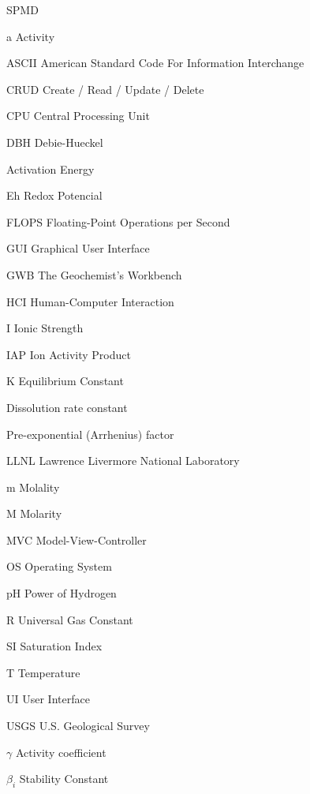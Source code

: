 \documentclass[ppgc,mestrado,English]{iiufrgs}
\begin{document}
\begin{listofabbrv}{SPMD}
\item[a] Activity
\item[ASCII] American Standard Code For Information Interchange
\item[CRUD] Create / Read / Update / Delete
\item[CPU] Central Processing Unit
\item[DBH] Debie-Hueckel 
\item[\ce{E_a}] Activation Energy
\item[Eh] Redox Potencial
\item[FLOPS] Floating-Point Operations per Second
\item[GUI] Graphical User Interface
\item[GWB] The Geochemist's Workbench
\item[HCI] Human-Computer Interaction        
\item[I] Ionic Strength
\item[IAP] Ion Activity Product 
\item[K] Equilibrium Constant        
\item[\ce{k_{diss}}] Dissolution rate constant
\item[\ce{k_0}] Pre-exponential (Arrhenius) factor
\item[LLNL] Lawrence Livermore National Laboratory
\item[m] Molality
\item[M] Molarity
\item[MVC] Model-View-Controller
\item[OS] Operating System
\item[pH] Power of Hydrogen
\item[R] Universal Gas Constant
\item[SI] Saturation Index 
\item[T] Temperature
\item[UI] User Interface
\item[USGS] U.S. Geological Survey
\item[$\gamma$] Activity coefficient
\item[$\beta_i$] Stability Constant         
\end{listofabbrv}


\end{document}
